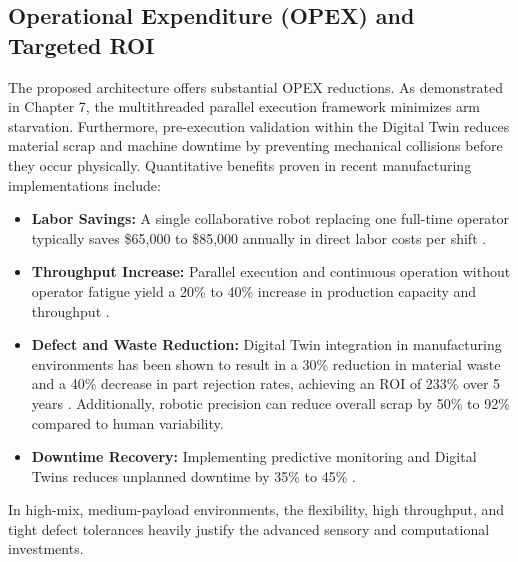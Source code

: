 \subsection{Operational Expenditure (OPEX) and Targeted ROI}
The proposed architecture offers substantial OPEX reductions. As demonstrated in Chapter 7, the multithreaded parallel execution framework minimizes arm starvation. Furthermore, pre-execution validation within the Digital Twin reduces material scrap and machine downtime by preventing mechanical collisions before they occur physically. Quantitative benefits proven in recent manufacturing implementations include:
\begin{itemize}
    \item \textbf{Labor Savings:} A single collaborative robot replacing one full-time operator typically saves \$65,000 to \$85,000 annually in direct labor costs per shift \cite{szghtech2026cobot}.
    \item \textbf{Throughput Increase:} Parallel execution and continuous operation without operator fatigue yield a 20\% to 40\% increase in production capacity and throughput \cite{ifactory2026calculator, szghtech2026cobot}.
    \item \textbf{Defect and Waste Reduction:} Digital Twin integration in manufacturing environments has been shown to result in a 30\% reduction in material waste and a 40\% decrease in part rejection rates, achieving an ROI of 233\% over 5 years \cite{dataparc2026dt, iotforall2026digitaltwin}. Additionally, robotic precision can reduce overall scrap by 50\% to 92\% compared to human variability.
    \item \textbf{Downtime Recovery:} Implementing predictive monitoring and Digital Twins reduces unplanned downtime by 35\% to 45\% \cite{iotforall2026digitaltwin}.
\end{itemize}

In high-mix, medium-payload environments, the flexibility, high throughput, and tight defect tolerances heavily justify the advanced sensory and computational investments.